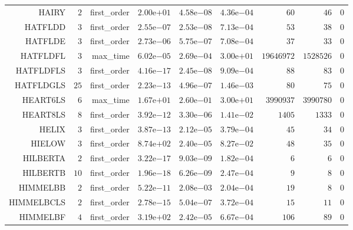 \begin{longtable}{rrrrrrrrr}
HAIRY & \(     2\) & first\_order & \( 2.00\)e\(+01\) & \( 4.58\)e\(-08\) & \( 4.36\)e\(-04\) & \(    60\) & \(    46\) & \(     0\) \\
HATFLDD & \(     3\) & first\_order & \( 2.55\)e\(-07\) & \( 2.53\)e\(-08\) & \( 7.13\)e\(-04\) & \(    53\) & \(    38\) & \(     0\) \\
HATFLDE & \(     3\) & first\_order & \( 2.73\)e\(-06\) & \( 5.75\)e\(-07\) & \( 7.08\)e\(-04\) & \(    37\) & \(    33\) & \(     0\) \\
HATFLDFL & \(     3\) & max\_time & \( 6.02\)e\(-05\) & \( 2.69\)e\(-04\) & \( 3.00\)e\(+01\) & \(19646972\) & \(1528526\) & \(     0\) \\
HATFLDFLS & \(     3\) & first\_order & \( 4.16\)e\(-17\) & \( 2.45\)e\(-08\) & \( 9.09\)e\(-04\) & \(    88\) & \(    83\) & \(     0\) \\
HATFLDGLS & \(    25\) & first\_order & \( 2.23\)e\(-13\) & \( 4.96\)e\(-07\) & \( 1.46\)e\(-03\) & \(    80\) & \(    75\) & \(     0\) \\
HEART6LS & \(     6\) & max\_time & \( 1.67\)e\(+01\) & \( 2.60\)e\(-01\) & \( 3.00\)e\(+01\) & \(3990937\) & \(3990780\) & \(     0\) \\
HEART8LS & \(     8\) & first\_order & \( 3.92\)e\(-12\) & \( 3.30\)e\(-06\) & \( 1.41\)e\(-02\) & \(  1405\) & \(  1333\) & \(     0\) \\
HELIX & \(     3\) & first\_order & \( 3.87\)e\(-13\) & \( 2.12\)e\(-05\) & \( 3.79\)e\(-04\) & \(    45\) & \(    34\) & \(     0\) \\
HIELOW & \(     3\) & first\_order & \( 8.74\)e\(+02\) & \( 2.40\)e\(-05\) & \( 8.27\)e\(-02\) & \(    48\) & \(    35\) & \(     0\) \\
HILBERTA & \(     2\) & first\_order & \( 3.22\)e\(-17\) & \( 9.03\)e\(-09\) & \( 1.82\)e\(-04\) & \(     6\) & \(     6\) & \(     0\) \\
HILBERTB & \(    10\) & first\_order & \( 1.96\)e\(-18\) & \( 6.26\)e\(-09\) & \( 2.47\)e\(-04\) & \(     9\) & \(     8\) & \(     0\) \\
HIMMELBB & \(     2\) & first\_order & \( 5.22\)e\(-11\) & \( 2.08\)e\(-03\) & \( 2.04\)e\(-04\) & \(    19\) & \(     8\) & \(     0\) \\
HIMMELBCLS & \(     2\) & first\_order & \( 2.78\)e\(-15\) & \( 5.04\)e\(-07\) & \( 3.72\)e\(-04\) & \(    15\) & \(    11\) & \(     0\) \\
HIMMELBF & \(     4\) & first\_order & \( 3.19\)e\(+02\) & \( 2.42\)e\(-05\) & \( 6.67\)e\(-04\) & \(   106\) & \(    89\) & \(     0\) \\

\end{longtable}
